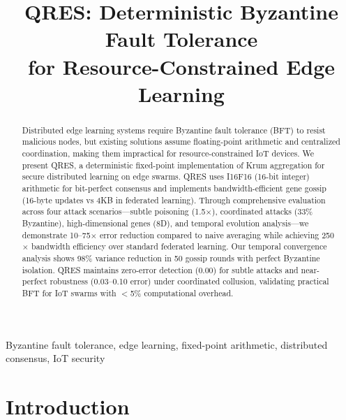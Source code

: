 \documentclass[conference,10pt]{IEEEtran}
\begin{document}
\title{QRES: Deterministic Byzantine Fault Tolerance\\for Resource-Constrained Edge Learning}

\author{
}

\maketitle

\begin{abstract}
Distributed edge learning systems require Byzantine fault tolerance (BFT) to resist malicious nodes, but existing solutions assume floating-point arithmetic and centralized coordination, making them impractical for resource-constrained IoT devices. We present QRES, a deterministic fixed-point implementation of Krum aggregation for secure distributed learning on edge swarms. QRES uses I16F16 (16-bit integer) arithmetic for bit-perfect consensus and implements bandwidth-efficient gene gossip (16-byte updates vs 4KB in federated learning). Through comprehensive evaluation across four attack scenarios---subtle poisoning (1.5$\times$), coordinated attacks (33\% Byzantine), high-dimensional genes (8D), and temporal evolution analysis---we demonstrate 10--75$\times$ error reduction compared to naive averaging while achieving 250$\times$ bandwidth efficiency over standard federated learning. Our temporal convergence analysis shows 98\% variance reduction in 50 gossip rounds with perfect Byzantine isolation. QRES maintains zero-error detection (0.00) for subtle attacks and near-perfect robustness (0.03--0.10 error) under coordinated collusion, validating practical BFT for IoT swarms with $<$5\% computational overhead.
\end{abstract}

\begin{IEEEkeywords}
Byzantine fault tolerance, edge learning, fixed-point arithmetic, distributed consensus, IoT security
\end{IEEEkeywords}

\section{Introduction}
\end{document}
